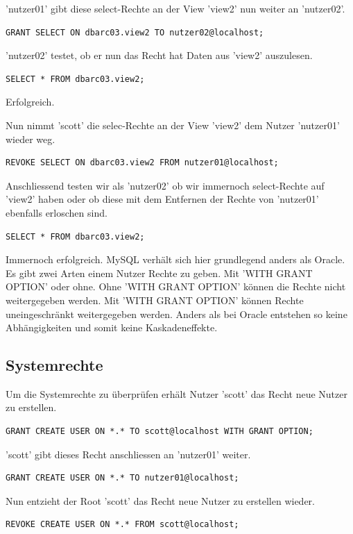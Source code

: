 \documentclass[10pt]{scrreprt}
\begin{document}
'nutzer01' gibt diese select-Rechte an der View 'view2' nun weiter an 'nutzer02'.
\begin{lstlisting}[style=sql]
GRANT SELECT ON dbarc03.view2 TO nutzer02@localhost;
\end{lstlisting}

'nutzer02' testet, ob er nun das Recht hat Daten aus 'view2' auszulesen.
\begin{lstlisting}[style=sql]
SELECT * FROM dbarc03.view2;
\end{lstlisting}
Erfolgreich.

Nun nimmt 'scott' die selec-Rechte an der View 'view2' dem Nutzer 'nutzer01' wieder weg.
\begin{lstlisting}[style=sql]
REVOKE SELECT ON dbarc03.view2 FROM nutzer01@localhost;
\end{lstlisting}

Anschliessend testen wir als 'nutzer02' ob wir immernoch select-Rechte auf 'view2' haben oder ob diese mit dem Entfernen der Rechte von 'nutzer01' ebenfalls erloschen sind. 
\begin{lstlisting}[style=sql]
SELECT * FROM dbarc03.view2;
\end{lstlisting}
Immernoch erfolgreich.
\newline\newline
MySQL verhält sich hier grundlegend anders als Oracle. Es gibt zwei Arten einem Nutzer Rechte zu geben. Mit 'WITH GRANT OPTION' oder ohne.\newline
Ohne 'WITH GRANT OPTION' können die Rechte nicht weitergegeben werden. Mit 'WITH GRANT OPTION' können Rechte uneingeschränkt weitergegeben werden. Anders als bei Oracle entstehen so keine Abhängigkeiten und somit keine Kaskadeneffekte.
\newpage
\subsection{Systemrechte}
Um die Systemrechte zu überprüfen erhält Nutzer 'scott' das Recht neue Nutzer zu erstellen.
\begin{lstlisting}[style=sql]
GRANT CREATE USER ON *.* TO scott@localhost WITH GRANT OPTION;
\end{lstlisting}

'scott' gibt dieses Recht anschliessen an 'nutzer01' weiter.
\begin{lstlisting}[style=sql]
GRANT CREATE USER ON *.* TO nutzer01@localhost;
\end{lstlisting}

Nun entzieht der Root 'scott' das Recht neue Nutzer zu erstellen wieder.
\begin{lstlisting}[style=sql]
REVOKE CREATE USER ON *.* FROM scott@localhost;
\end{lstlisting}
\end{document}
